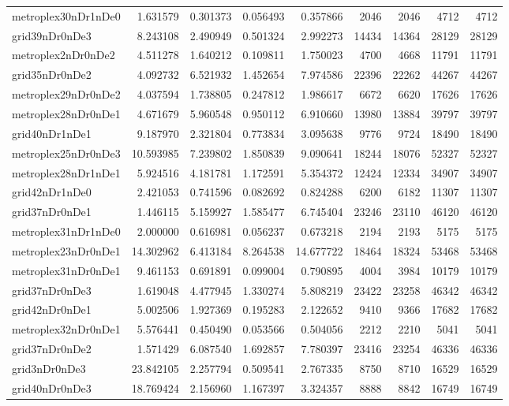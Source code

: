 \begin{longtable}{|l|r|r|r|r|r|r|r|r|}
metroplex30nDr1nDe0 & 1.631579 & 0.301373 & 0.056493 & 0.357866 & 2046 & 2046 & 4712 & 4712 \\
grid39nDr0nDe3 & 8.243108 & 2.490949 & 0.501324 & 2.992273 & 14434 & 14364 & 28129 & 28129 \\
metroplex2nDr0nDe2 & 4.511278 & 1.640212 & 0.109811 & 1.750023 & 4700 & 4668 & 11791 & 11791 \\
grid35nDr0nDe2 & 4.092732 & 6.521932 & 1.452654 & 7.974586 & 22396 & 22262 & 44267 & 44267 \\
metroplex29nDr0nDe2 & 4.037594 & 1.738805 & 0.247812 & 1.986617 & 6672 & 6620 & 17626 & 17626 \\
metroplex28nDr0nDe1 & 4.671679 & 5.960548 & 0.950112 & 6.910660 & 13980 & 13884 & 39797 & 39797 \\
grid40nDr1nDe1 & 9.187970 & 2.321804 & 0.773834 & 3.095638 & 9776 & 9724 & 18490 & 18490 \\
metroplex25nDr0nDe3 & 10.593985 & 7.239802 & 1.850839 & 9.090641 & 18244 & 18076 & 52327 & 52327 \\
metroplex28nDr1nDe1 & 5.924516 & 4.181781 & 1.172591 & 5.354372 & 12424 & 12334 & 34907 & 34907 \\
grid42nDr1nDe0 & 2.421053 & 0.741596 & 0.082692 & 0.824288 & 6200 & 6182 & 11307 & 11307 \\
grid37nDr0nDe1 & 1.446115 & 5.159927 & 1.585477 & 6.745404 & 23246 & 23110 & 46120 & 46120 \\
metroplex31nDr1nDe0 & 2.000000 & 0.616981 & 0.056237 & 0.673218 & 2194 & 2193 & 5175 & 5175 \\
metroplex23nDr0nDe1 & 14.302962 & 6.413184 & 8.264538 & 14.677722 & 18464 & 18324 & 53468 & 53468 \\
metroplex31nDr0nDe1 & 9.461153 & 0.691891 & 0.099004 & 0.790895 & 4004 & 3984 & 10179 & 10179 \\
grid37nDr0nDe3 & 1.619048 & 4.477945 & 1.330274 & 5.808219 & 23422 & 23258 & 46342 & 46342 \\
grid42nDr0nDe1 & 5.002506 & 1.927369 & 0.195283 & 2.122652 & 9410 & 9366 & 17682 & 17682 \\
metroplex32nDr0nDe1 & 5.576441 & 0.450490 & 0.053566 & 0.504056 & 2212 & 2210 & 5041 & 5041 \\
grid37nDr0nDe2 & 1.571429 & 6.087540 & 1.692857 & 7.780397 & 23416 & 23254 & 46336 & 46336 \\
grid3nDr0nDe3 & 23.842105 & 2.257794 & 0.509541 & 2.767335 & 8750 & 8710 & 16529 & 16529 \\
grid40nDr0nDe3 & 18.769424 & 2.156960 & 1.167397 & 3.324357 & 8888 & 8842 & 16749 & 16749 \\

\end{longtable}
